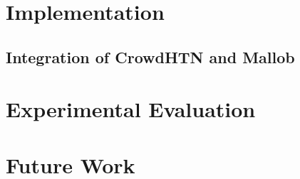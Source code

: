\documentclass[12pt,a4paper,twoside]{scrartcl}
\numberwithin{equation}{section}
\begin{document}
\section{Implementation}

\subsection{Integration of CrowdHTN and Mallob}

\section{Experimental Evaluation}

\section{Future Work}

\clearpage




\end{document}
